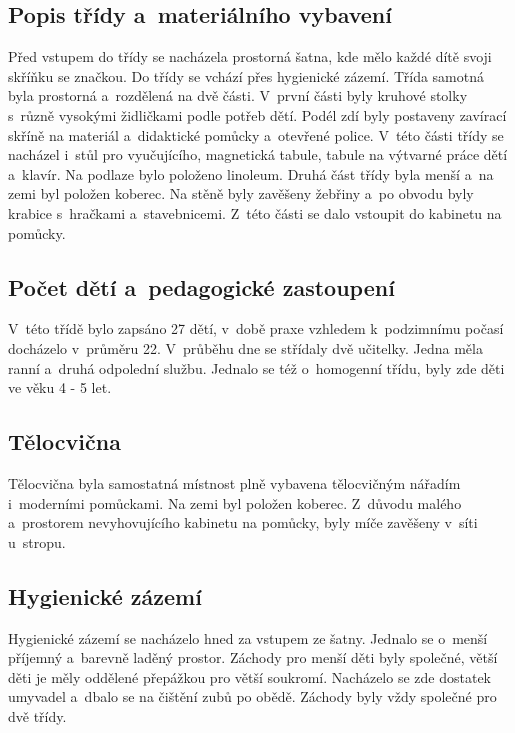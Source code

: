 
		\subsection{Popis třídy a~materiálního vybavení}

			Před vstupem do třídy se nacházela prostorná šatna, kde mělo každé dítě svoji skříňku se značkou. Do třídy se vchází přes hygienické zázemí. Třída samotná byla prostorná a~rozdělená na dvě části. V~první části byly kruhové stolky s~různě vysokými židličkami podle potřeb dětí. Podél zdí byly postaveny zavírací skříně na materiál a~didaktické pomůcky a~otevřené police. V~této části třídy se nacházel i~stůl pro vyučujícího, magnetická tabule, tabule na výtvarné práce dětí a~klavír. Na podlaze bylo položeno linoleum. Druhá část třídy byla menší a~na zemi byl položen koberec. Na stěně byly zavěšeny žebřiny a~po obvodu byly krabice s~hračkami a~stavebnicemi. Z~této části se dalo vstoupit do kabinetu na pomůcky.

		\subsection{Počet dětí a~pedagogické zastoupení}

			V~této třídě bylo zapsáno 27 dětí, v~době praxe vzhledem k~podzimnímu počasí docházelo v~průměru 22. V~průběhu dne se střídaly dvě učitelky. Jedna měla ranní a~druhá odpolední službu.
			Jednalo se též o~homogenní třídu, byly zde děti ve věku 4 - 5 let.
		
		\subsection{Tělocvična}
			Tělocvična byla samostatná místnost plně vybavena tělocvičným nářadím i~moderními pomůckami. Na zemi byl položen koberec. Z~důvodu malého a~prostorem nevyhovujícího kabinetu na pomůcky,  byly míče zavěšeny v~síti u~stropu.

		\subsection{Hygienické zázemí}
			Hygienické zázemí se nacházelo hned za vstupem ze šatny. Jednalo se o~menší příjemný a~barevně laděný prostor. Záchody pro menší děti byly společné, větší děti je měly oddělené přepážkou pro větší soukromí. Nacházelo se zde dostatek umyvadel a~dbalo se na čištění zubů po obědě. Záchody byly vždy společné pro dvě třídy. 

